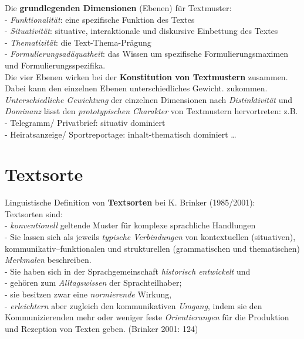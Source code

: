 \documentclass[
  letterpaper,
]{scrbook}
\begin{document}
Die \textbf{grundlegenden Dimensionen} (Ebenen) für Textmuster:\\
- \emph{Funktionalität}: eine spezifische Funktion des Textes\\
- \emph{Situativität}: situative, interaktionale und diskursive
Einbettung des Textes\\
- \emph{Thematizität}: die Text-Thema-Prägung\\
- \emph{Formulierungsadäquatheit}: das Wissen um spezifische
Formulierungsmaximen und Formulierungsspezifika.\\

Die vier Ebenen wirken bei der \textbf{Konstitution von Textmustern}
zusammen. Dabei kann den einzelnen Ebenen unterschiedliches Gewicht.
zukommen. \emph{Unterschiedliche Gewichtung} der einzelnen Dimensionen
nach \emph{Distinktivität} und \emph{Dominanz} lässt den
\emph{prototypischen Charakter} von Textmustern hervortreten: z.B.\\
- Telegramm/ Privatbrief: situativ dominiert\\
- Heiratsanzeige/ Sportreportage: inhalt-thematisch dominiert \ldots{}\\

\hypertarget{textsorte}{%
\section{Textsorte}\label{textsorte}}

Linguistische Definition von \textbf{Textsorten} bei K. Brinker
(1985/2001):\\
Textsorten sind:\\
- \emph{konventionell} geltende Muster für komplexe sprachliche
Handlungen\\
- Sie lassen sich als jeweils \emph{typische Verbindungen} von
kontextuellen (situativen), kommunikativ--funktionalen und strukturellen
(grammatischen und thematischen) \emph{Merkmalen} beschreiben.\\
- Sie haben sich in der Sprachgemeinschaft \emph{historisch entwickelt}
und\\
- gehören zum \emph{Alltagswissen} der Sprachteilhaber;\\
- sie besitzen zwar eine \emph{normierende} Wirkung,\\
- \emph{erleichtern} aber zugleich den kommunikativen \emph{Umgang},
indem sie den Kommunizierenden mehr oder weniger feste
\emph{Orientierungen} für die Produktion und Rezeption von Texten geben.
(Brinker 2001: 124)
\end{document}
